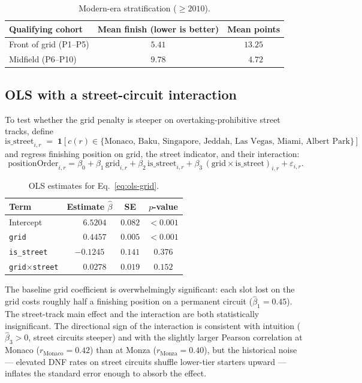 \documentclass[11pt,a4paper]{article}
\newcommand{\code}[1]{\texttt{\small #1}}
\theoremstyle{remark}
\begin{document}
\begin{table}[H]
  \centering
  \caption{Modern-era stratification ($\geq 2010$).}
  \label{tab:era-strat}
  \begin{tabular}{lcc}
    \toprule
    Qualifying cohort & Mean finish (lower is better) & Mean points \\
    \midrule
    Front of grid (P1--P5) & $5.41$ & $13.25$ \\
    Midfield (P6--P10)     & $9.78$ & $\phantom{0}4.72$ \\
    \bottomrule
  \end{tabular}
\end{table}

\subsection{OLS with a street-circuit interaction}
To test whether the grid penalty is steeper on overtaking-prohibitive
street tracks, define
\[
\text{is\_street}_{i,r}\;=\;\mathbf{1}\!\left[c(r)\in\{\text{Monaco, Baku, Singapore,
Jeddah, Las Vegas, Miami, Albert Park}\}\right]
\]
and regress finishing position on grid, the street indicator, and
their interaction:
\begin{equation}
\text{positionOrder}_{i,r}
=\beta_0+\beta_1\,\text{grid}_{i,r}+\beta_2\,\text{is\_street}_{i,r}
+\beta_3\,(\text{grid}\times\text{is\_street})_{i,r}+\varepsilon_{i,r}.
\label{eq:ols-grid}
\end{equation}

\begin{table}[H]
  \centering
  \caption{OLS estimates for Eq.~\eqref{eq:ols-grid}.}
  \label{tab:ols-grid}
  \begin{tabular}{lccc}
    \toprule
    Term & Estimate $\hat\beta$ & SE & $p$-value \\
    \midrule
    Intercept             & $\phantom{-}6.5204$ & $0.082$ & $<0.001$ \\
    \code{grid}           & $\phantom{-}0.4457$ & $0.005$ & $<0.001$ \\
    \code{is\_street}     & $-0.1245$ & $0.141$ & $0.376$ \\
    \code{grid$\times$street} & $\phantom{-}0.0278$ & $0.019$ & $0.152$ \\
    \bottomrule
  \end{tabular}
\end{table}

The baseline grid coefficient is overwhelmingly significant: each
slot lost on the grid costs roughly half a finishing position on a
permanent circuit ($\hat\beta_1=0.45$). The street-track main effect
and the interaction are both statistically insignificant. The
directional sign of the interaction is consistent with intuition
($\hat\beta_3>0$, street circuits steeper) and with the slightly
larger Pearson correlation at Monaco
($r_\text{Monaco}=0.42$) than at Monza ($r_\text{Monza}=0.40$), but
the historical noise --- elevated DNF rates on street circuits
shuffle lower-tier starters upward --- inflates the standard error
enough to absorb the effect.
\end{document}
